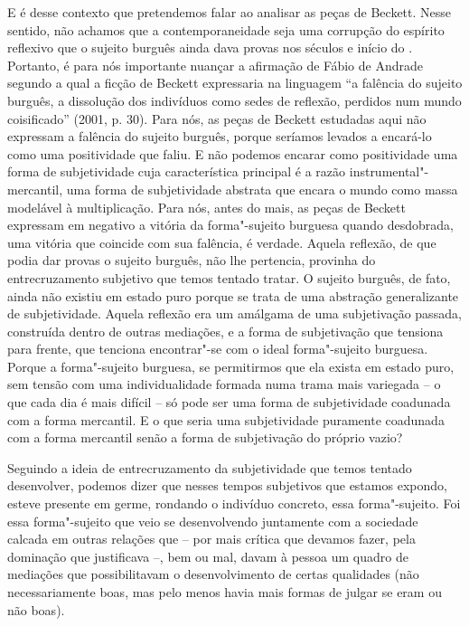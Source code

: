 {E é desse contexto que pretendemos falar ao analisar as peças de
Beckett. Nesse sentido, não achamos que a contemporaneidade seja uma
corrupção do espírito reflexivo que o sujeito burguês ainda dava provas
nos séculos  e início do . Portanto, é para nós importante nuançar
a afirmação de Fábio de Andrade segundo a qual a ficção de Beckett
expressaria na linguagem ``a falência do sujeito burguês, a dissolução
dos indivíduos como sedes de reflexão, perdidos num mundo coisificado''
(2001, p. 30). Para nós, as peças de Beckett estudadas aqui não
expressam a falência do sujeito burguês, porque seríamos levados a
encará-lo como uma positividade que faliu. E não podemos encarar como
positividade uma forma de subjetividade cuja característica principal é
a razão instrumental"-mercantil, uma forma de subjetividade abstrata que
encara o mundo como massa modelável à multiplicação. Para nós, antes do
mais, as peças de Beckett expressam em negativo a vitória da
forma"-sujeito burguesa quando desdobrada, uma vitória que coincide com
sua falência, é verdade. Aquela reflexão, de que podia dar provas o
sujeito burguês, não lhe pertencia, provinha do entrecruzamento
subjetivo que temos tentado tratar. O sujeito burguês, de fato, ainda
não existiu em estado puro porque se trata de uma abstração
generalizante de subjetividade. Aquela reflexão era um amálgama de uma
subjetivação passada, construída dentro de outras mediações, e a forma
de subjetivação que tensiona para frente, que tenciona encontrar"-se com
o ideal forma"-sujeito burguesa. Porque a forma"-sujeito burguesa, se
permitirmos que ela exista em estado puro, sem tensão com uma
individualidade formada numa trama mais variegada -- o que cada dia é
mais difícil -- só pode ser uma forma de subjetividade coadunada com a
forma mercantil. E o que seria uma subjetividade puramente coadunada com
a forma mercantil senão a forma de subjetivação do próprio vazio?

Seguindo a ideia de entrecruzamento da subjetividade que temos tentado
desenvolver, podemos dizer que nesses tempos subjetivos que estamos
expondo, esteve presente em germe, rondando o indivíduo concreto, essa
forma"-sujeito. Foi essa forma"-sujeito que veio se desenvolvendo
juntamente com a sociedade calcada em outras relações que -- por mais
crítica que devamos fazer, pela dominação que justificava --, bem ou
mal, davam à pessoa um quadro de mediações que possibilitavam o
desenvolvimento de certas qualidades (não necessariamente boas, mas pelo
menos havia mais formas de julgar se eram ou não boas).

}
